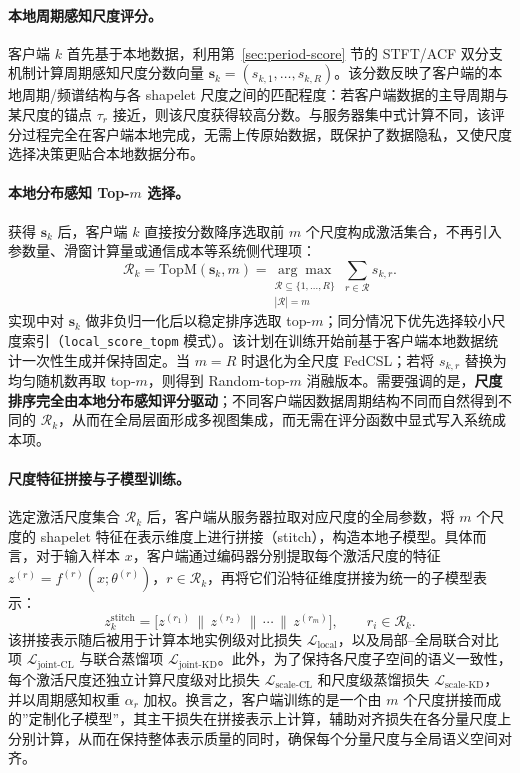 \documentclass{article}
\begin{document}
\paragraph{本地周期感知尺度评分。}
客户端 $k$ 首先基于本地数据，利用第~\ref{sec:period-score} 节的 STFT/ACF 双分支机制计算周期感知尺度分数向量 $\mathbf{s}_k=(s_{k,1},\ldots,s_{k,R})$。该分数反映了客户端的本地周期/频谱结构与各 shapelet 尺度之间的匹配程度：若客户端数据的主导周期与某尺度的锚点 $\tau_r$ 接近，则该尺度获得较高分数。与服务器集中式计算不同，该评分过程完全在客户端本地完成，无需上传原始数据，既保护了数据隐私，又使尺度选择决策更贴合本地数据分布。

\paragraph{本地分布感知 Top-$m$ 选择。}
获得 $\mathbf{s}_k$ 后，客户端 $k$ 直接按分数降序选取前 $m$ 个尺度构成激活集合，不再引入参数量、滑窗计算量或通信成本等系统侧代理项：
\begin{equation}
\mathcal{R}_k=\mathrm{TopM}(\mathbf{s}_k,m)
=\underset{\substack{\mathcal{R}\subseteq\{1,\ldots,R\}\\|\mathcal{R}|=m}}{\arg\max}\;
\sum_{r\in\mathcal{R}} s_{k,r}.
\label{eq:spilter-topm}
\end{equation}
实现中对 $\mathbf{s}_k$ 做非负归一化后以稳定排序选取 top-$m$；同分情况下优先选择较小尺度索引（\texttt{local\_score\_topm} 模式）。该计划在训练开始前基于客户端本地数据统计一次性生成并保持固定。当 $m=R$ 时退化为全尺度 FedCSL；若将 $s_{k,r}$ 替换为均匀随机数再取 top-$m$，则得到 Random-top-$m$ 消融版本。需要强调的是，\textbf{尺度排序完全由本地分布感知评分驱动}；不同客户端因数据周期结构不同而自然得到不同的 $\mathcal{R}_k$，从而在全局层面形成多视图集成，而无需在评分函数中显式写入系统成本项。

\paragraph{尺度特征拼接与子模型训练。}
选定激活尺度集合 $\mathcal{R}_k$ 后，客户端从服务器拉取对应尺度的全局参数，将 $m$ 个尺度的 shapelet 特征在表示维度上进行拼接（stitch），构造本地子模型。具体而言，对于输入样本 $x$，客户端通过编码器分别提取每个激活尺度的特征 $z^{(r)} = f^{(r)}(x; \theta^{(r)})$，$r\in\mathcal{R}_k$，再将它们沿特征维度拼接为统一的子模型表示：
\begin{equation}
z^{\mathrm{stitch}}_k = \bigl[z^{(r_1)} \,\|\, z^{(r_2)} \,\|\, \cdots \,\|\, z^{(r_m)}\bigr],
\qquad r_i\in\mathcal{R}_k .
\label{eq:stitch}
\end{equation}
该拼接表示随后被用于计算本地实例级对比损失 $\mathcal{L}_{\text{local}}$，以及局部--全局联合对比项 $\mathcal{L}_{\text{joint-CL}}$ 与联合蒸馏项 $\mathcal{L}_{\text{joint-KD}}$。此外，为了保持各尺度子空间的语义一致性，每个激活尺度还独立计算尺度级对比损失 $\mathcal{L}_{\text{scale-CL}}$ 和尺度级蒸馏损失 $\mathcal{L}_{\text{scale-KD}}$，并以周期感知权重 $\alpha_r$ 加权。换言之，客户端训练的是一个由 $m$ 个尺度拼接而成的”定制化子模型”，其主干损失在拼接表示上计算，辅助对齐损失在各分量尺度上分别计算，从而在保持整体表示质量的同时，确保每个分量尺度与全局语义空间对齐。
\end{document}
